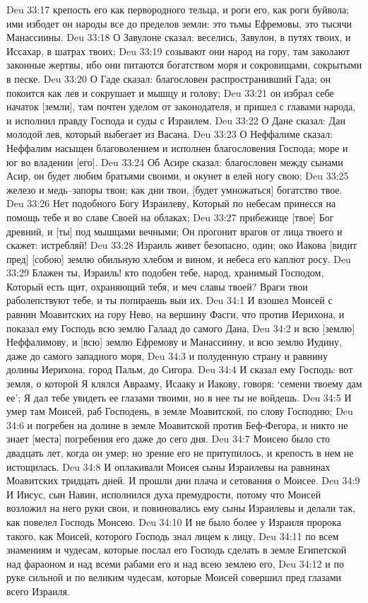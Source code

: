 Deu 33:17  крепость его как первородного тельца, и роги его, как роги буйвола; ими избодет он народы все до пределов земли: это тьмы Ефремовы, это тысячи Манассиины.
Deu 33:18  О Завулоне сказал: веселись, Завулон, в путях твоих, и Иссахар, в шатрах твоих;
Deu 33:19  созывают они народ на гору, там заколают законные жертвы, ибо они питаются богатством моря и сокровищами, сокрытыми в песке.
Deu 33:20  О Гаде сказал: благословен распространивший Гада; он покоится как лев и сокрушает и мышцу и голову;
Deu 33:21  он избрал себе начаток [земли], там почтен уделом от законодателя, и пришел с главами народа, и исполнил правду Господа и суды с Израилем.
Deu 33:22  О Дане сказал: Дан молодой лев, который выбегает из Васана.
Deu 33:23  О Неффалиме сказал: Неффалим насыщен благоволением и исполнен благословения Господа; море и юг во владении [его].
Deu 33:24  Об Асире сказал: благословен между сынами Асир, он будет любим братьями своими, и окунет в елей ногу свою;
Deu 33:25  железо и медь--запоры твои; как дни твои, [будет умножаться] богатство твое.
Deu 33:26  Нет подобного Богу Израилеву, Который по небесам принесся на помощь тебе и во славе Своей на облаках;
Deu 33:27  прибежище [твое] Бог древний, и [ты] под мышцами вечными; Он прогонит врагов от лица твоего и скажет: истребляй!
Deu 33:28  Израиль живет безопасно, один; око Иакова [видит пред] [собою] землю обильную хлебом и вином, и небеса его каплют росу.
Deu 33:29  Блажен ты, Израиль! кто подобен тебе, народ, хранимый Господом, Который есть щит, охраняющий тебя, и меч славы твоей? Враги твои раболепствуют тебе, и ты попираешь выи их.
Deu 34:1  И взошел Моисей с равнин Моавитских на гору Нево, на вершину Фасги, что против Иерихона, и показал ему Господь всю землю Галаад до самого Дана,
Deu 34:2  и всю [землю] Неффалимову, и [всю] землю Ефремову и Манассиину, и всю землю Иудину, даже до самого западного моря,
Deu 34:3  и полуденную страну и равнину долины Иерихона, город Пальм, до Сигора.
Deu 34:4  И сказал ему Господь: вот земля, о которой Я клялся Аврааму, Исааку и Иакову, говоря: `семени твоему дам ее'; Я дал тебе увидеть ее глазами твоими, но в нее ты не войдешь.
Deu 34:5  И умер там Моисей, раб Господень, в земле Моавитской, по слову Господню;
Deu 34:6  и погребен на долине в земле Моавитской против Беф-Фегора, и никто не знает [места] погребения его даже до сего дня.
Deu 34:7  Моисею было сто двадцать лет, когда он умер; но зрение его не притупилось, и крепость в нем не истощилась.
Deu 34:8  И оплакивали Моисея сыны Израилевы на равнинах Моавитских тридцать дней. И прошли дни плача и сетования о Моисее.
Deu 34:9  И Иисус, сын Навин, исполнился духа премудрости, потому что Моисей возложил на него руки свои, и повиновались ему сыны Израилевы и делали так, как повелел Господь Моисею.
Deu 34:10  И не было более у Израиля пророка такого, как Моисей, которого Господь знал лицем к лицу,
Deu 34:11  по всем знамениям и чудесам, которые послал его Господь сделать в земле Египетской над фараоном и над всеми рабами его и над всею землею его,
Deu 34:12  и по руке сильной и по великим чудесам, которые Моисей совершил пред глазами всего Израиля.


